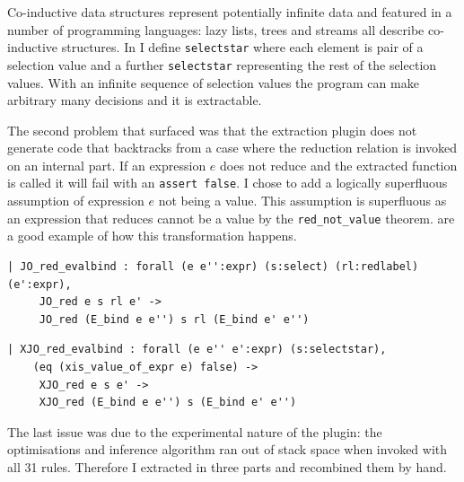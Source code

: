 \documentclass[12pt,twoside,notitlepage]{report}
\theoremstyle{plain}%
\theoremstyle{definition}
\theoremstyle{remark}
\begin{document}
Co-inductive data structures represent potentially infinite data and featured in a number of programming languages: lazy lists, trees and streams all describe co-inductive structures. In  I define \verb|selectstar| where each element is pair of a selection value and a further \verb|selectstar| representing the rest of the selection values.  With an infinite sequence of selection values the program can make arbitrary many decisions and it is extractable.

The second problem that surfaced was that the extraction plugin does not generate code that backtracks from a case where the reduction relation is invoked on an internal part. If an expression $ e $ does not reduce and the extracted function is called it will fail with an \lstinline|assert false|. I chose to add a logically superfluous assumption of expression $ e $ not being a value. This assumption is superfluous as an expression that reduces cannot be a value by the \verb|red_not_value| theorem.   are a good example of how this transformation happens. \vspace{4mm}

\begin{minipage}{0.9\linewidth}

\begin{lstlisting}[language={Coq},caption={Coq reduction clause with unsafe assumption}, label={lst:coqredunsafe}]
| JO_red_evalbind : forall (e e'':expr) (s:select) (rl:redlabel) (e':expr),
     JO_red e s rl e' ->
     JO_red (E_bind e e'') s rl (E_bind e' e'')
\end{lstlisting}

\end{minipage}

\begin{minipage}{\linewidth}

\begin{lstlisting}[language={Coq},caption={Coq extractable reduction clause with safe assumption}, label={lst:coqxredsafe}]
 | XJO_red_evalbind : forall (e e'' e':expr) (s:selectstar),
    (eq (xis_value_of_expr e) false) ->
     XJO_red e s e' ->
     XJO_red (E_bind e e'') s (E_bind e' e'')
\end{lstlisting}

\end{minipage}


The last issue was due to the experimental nature of the plugin: the optimisations and inference algorithm ran out of stack space when invoked with all 31 rules. Therefore I extracted in three parts and recombined them by hand.
\end{document}
